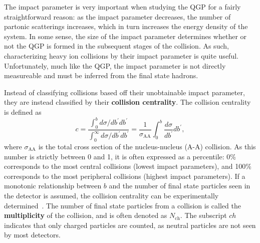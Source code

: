 The impact parameter is very important when studying the QGP for a fairly straightforward reason: as the impact parameter decreases, the number of partonic scatterings increases, which in turn increases the energy density of the system. In some sense, the size of the impact parameter determines whether or not the QGP is formed in the subsequent stages of the collision. As such, characterizing heavy ion collisions by their impact parameter is quite useful.  Unfortunately, much like the QGP, the impact parameter is not directly measureable and must be inferred from the final state hadrons.

Instead of classifying collisions based off their unobtainable impact parameter, they are instead classified by their \textbf{collision centrality}. The collision centrality is defined as
%
\begin{equation}
    \label{eq:centrality}
    c=\frac{\int_0^b d \sigma / d b^{\prime} d b^{\prime}}{\int_0^{\infty} d \sigma / d b^{\prime} d b^{\prime}}=\frac{1}{\sigma_{\mathrm{AA}}} \int_0^b \frac{d \sigma}{d b^{\prime}} d b^{\prime},
\end{equation}
%
where $\sigma_{\mathrm{AA}}$ is the total cross section of the nucleus-nucleus (A-A) collision. As this number is strictly between 0 and 1, it is often expressed as a percentile: 0\% corresponds to the most central collisions (lowest impact parameters), and 100\% corresponds to the most peripheral collisions (highest impact parameters). If a monotonic relationship between $b$ and the number of final state particles seen in the detector is assumed, the collision centrality can be experimentally determined~\cite{GlauberModelALICE1}. The number of final state particles from a collision is called the \textbf{multiplicity} of the collision, and is often denoted as $N_\text{ch}$. The subscript $ch$ indicates that only charged particles are counted, as neutral particles are not seen by most detectors. 

